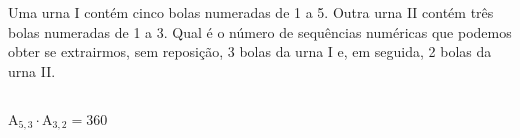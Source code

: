 \begin{ex}
 Uma urna I contém cinco bolas numeradas de 1 a 5. Outra urna II contém três bolas numeradas de 1 a 3.  Qual é o número de sequências numéricas que podemos obter se extrairmos, sem reposição, 3 bolas da urna I e, em seguida, 2 bolas da urna II.
   \begin{sol}
   \phantom{A}\\
    $\mathrm{A}_{5,3}\cdot\mathrm{A}_{3,2}=360$
   \end{sol}
\end{ex}
